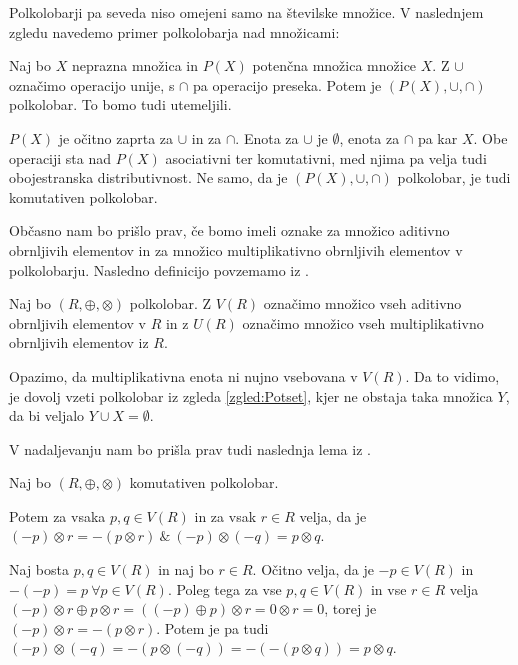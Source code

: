 \documentclass[mat1]{fmfdelo}
\begin{document}
Polkolobarji pa seveda niso omejeni samo na številske množice. V naslednjem zgledu navedemo primer polkolobarja nad množicami:
\begin{zgled} \label{zgled:Potset}
	Naj bo $X$ neprazna množica in $P(X)$ potenčna množica množice $X$. Z $\cup$ označimo operacijo unije, s $\cap$ pa operacijo preseka. Potem je $(P(X), \cup, \cap)$ polkolobar. To bomo tudi utemeljili.
	
	$P(X)$ je očitno zaprta za $\cup$ in za $\cap$. Enota za $\cup$ je $\emptyset$, enota za $\cap$ pa kar $X$. Obe operaciji sta nad $P(X)$ asociativni ter komutativni, med njima pa velja tudi obojestranska distributivnost. Ne samo, da je $(P(X), \cup, \cap)$ polkolobar, je tudi komutativen polkolobar.
\end{zgled}

Občasno nam bo prišlo prav, če bomo imeli oznake za množico aditivno obrnljivih elementov in za množico multiplikativno obrnljivih elementov v polkolobarju. Nasledno definicijo povzemamo iz \cite[str. $3$]{bib:Tanbase}.

\begin{definicija}
	Naj bo $(R, \oplus, \otimes)$ polkolobar. Z $V(R)$ označimo množico vseh aditivno obrnljivih elementov v $R$ in z $U(R)$ označimo množico vseh multiplikativno obrnljivih elementov iz $R$.
\end{definicija}

Opazimo, da multiplikativna enota ni nujno vsebovana v $V(R)$. Da to vidimo, je dovolj vzeti polkolobar iz zgleda \ref{zgled:Potset}, kjer ne obstaja taka množica $Y$, da bi veljalo $Y \cup X = \emptyset$.

V nadaljevanju nam bo prišla prav tudi naslednja lema iz \cite[lema 2\,1]{bib:Tanbase}.

\begin{lema} \label{lema:invvpolkolob}
	Naj bo $(R, \oplus, \otimes)$ komutativen polkolobar. 
	
	Potem za vsaka $p, q\in V(R)$ in za vsak $r\in R$ velja, da je $(-p)\otimes r = - (p\otimes r)~\&~ (-p)\otimes(-q) = p\otimes q$.
\end{lema}

\begin{dokaz}
	Naj bosta $p, q \in V(R)$ in naj bo $r\in R$. Očitno velja, da je $-p\in V(R)$ in $-(-p) = p~\forall p\in V(R)$. Poleg tega za vse $p, q\in V(R)$ in vse $r\in R$ velja $(-p)\otimes r \oplus p \otimes r = ((-p) \oplus p)\otimes r = 0\otimes r = 0$, torej je $(-p)\otimes r = -(p\otimes r)$. Potem je pa tudi $(-p)\otimes(-q) = -(p\otimes(-q)) = -(-(p\otimes q)) = p\otimes q$.
\end{dokaz}
\end{document}
